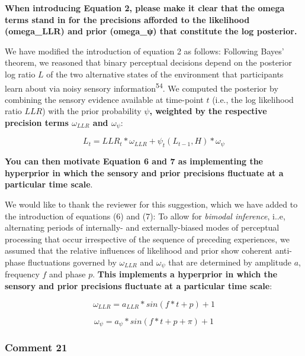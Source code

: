 \documentclass[
]{article}
\begin{document}
\textbf{When introducing Equation 2, please make it clear that the omega
terms stand in for the precisions afforded to the likelihood
(omega\_LLR) and prior (omega\_ψ) that constitute the log posterior.}

We have modified the introduction of equation 2 as follows: Following
Bayes' theorem, we reasoned that binary perceptual decisions depend on
the posterior log ratio \(L\) of the two alternative states of the
environment that participants learn about via noisy sensory
information\textsuperscript{54}. We computed the posterior by combining
the sensory evidence available at time-point \(t\) (i.e., the log
likelihood ratio \(LLR\)) with the prior probability \(\psi\)\textbf{,
weighted by the respective precision terms \(\omega_{LLR}\) and
\(\omega_{\psi}\)}:

\begin{equation}
L_t = LLR_t * \omega_{LLR} + \psi_t(L_{t-1}, H) * \omega_{\psi}
\end{equation}

\textbf{You can then motivate Equation 6 and 7 as implementing the
hyperprior in which the sensory and prior precisions fluctuate at a
particular time scale}.

We would like to thank the reviewer for this suggestion, which we have
added to the introduction of equations (6) and (7): To allow for
\emph{bimodal inference}, i..e, alternating periods of internally- and
externally-biased modes of perceptual processing that occur irrespective
of the sequence of preceding experiences, we assumed that the relative
influences of likelihood and prior show coherent anti-phase fluctuations
governed by \(\omega_{LLR}\) and \(\omega_{\psi}\) that are determined
by amplitude \(a\), frequency \(f\) and phase \(p\). \textbf{This
implements a hyperprior in which the sensory and prior precisions
fluctuate at a particular time scale}:

\begin{equation}
\omega_{LLR} = a_{LLR} * sin(f * t + p) + 1
\end{equation}

\begin{equation}
\omega_{\psi} = a_{\psi} * sin(f * t + p + \pi) + 1
\end{equation}

\hypertarget{comment-21}{%
\subsubsection{Comment 21}\label{comment-21}}
\end{document}
